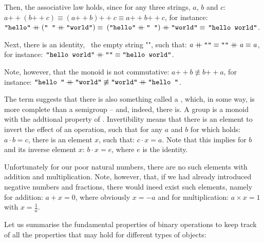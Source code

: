 \documentclass{scrreprt}
\newcommand{\Varid}[1]{\mathit{#1}}
\newcommand{\plus}{\mathbin{+\!\!\!+}}
\begin{document}
Then, the associative law holds, since for any three strings,
$a$, $b$ and $c$:
\ensuremath{\Varid{a}\plus (\Varid{b}\plus \Varid{c})\equiv (\Varid{a}\plus \Varid{b})\plus \Varid{c}\equiv \Varid{a}\plus \Varid{b}\plus \Varid{c}},
for instance:
\ensuremath{\text{\tt \char34 hello\char34}\plus (\text{\tt \char34 ~\char34}\plus \text{\tt \char34 world\char34})\equiv }
\ensuremath{(\text{\tt \char34 hello\char34}\plus \text{\tt \char34 ~\char34})\plus \text{\tt \char34 world\char34}\equiv } 
\ensuremath{\text{\tt \char34 hello~world\char34}}.

Next, there is an identity, \viz\ the empty string "",
such that:
\ensuremath{\Varid{a}\plus \text{\tt \char34 \char34}\equiv \text{\tt \char34 \char34}\plus \Varid{a}\equiv \Varid{a}},
for instance:
\ensuremath{\text{\tt \char34 hello~world\char34}\plus \text{\tt \char34 \char34}\equiv \text{\tt \char34 hello~world\char34}}.

Note, however, that the  monoid
is not commutative:
\ensuremath{\Varid{a}\plus \Varid{b}\not\equiv \Varid{b}\plus \Varid{a}},
for instance:
\ensuremath{\text{\tt \char34 hello~\char34}\plus \text{\tt \char34 world\char34}\not\equiv \text{\tt \char34 world\char34}\plus \text{\tt \char34 hello~\char34}}.

The term  suggests
that there is also something called a ,
which, in some way, is more complete
than a semigroup -- and, indeed, there is.
A group is a monoid with the addtional property
of .
Invertibility means that there is an element
to invert the effect of an operation, such that
for any $a$ and $b$ for which holds:
$a \cdot b = c$, there is an element $x$,
such that: $c \cdot x = a$.
Note that this implies for $b$ and its inverse element $x$:
$b \cdot x = e$, where $e$ is the identity.

Unfortunately for our poor natural numbers,
there are no such elements with addition and multiplication.
Note, however, that, if we had already introduced
negative numbers and fractions,
there would ineed exist such elements, namely
for addition: $a + x = 0$, where obviously $x=-a$ 
and for multiplication:
$a \times x = 1$ with $x = \frac{1}{a}$.

Let us summarise the fundamental properties
of binary operations to keep track of all
the properties that may hold for different types of objects:
\end{document}

